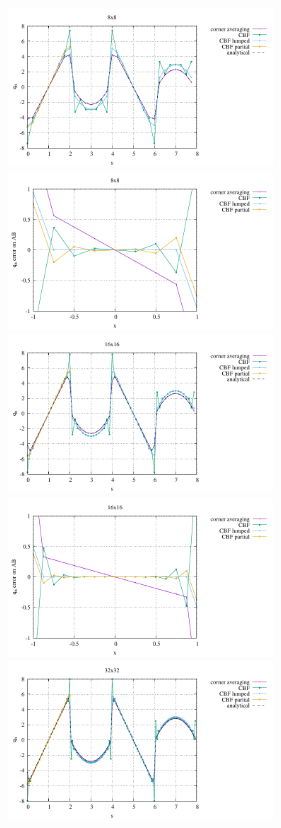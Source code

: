 \begin{center}
\includegraphics[width=7cm]{python_codes/fieldstone_173/results/exp5/heat_flux_boundary_8.pdf}
\includegraphics[width=7cm]{python_codes/fieldstone_173/results/exp5/heat_flux_boundary_bottom_8.pdf}\\
\includegraphics[width=7cm]{python_codes/fieldstone_173/results/exp5/heat_flux_boundary_16.pdf}
\includegraphics[width=7cm]{python_codes/fieldstone_173/results/exp5/heat_flux_boundary_bottom_16.pdf}\\
\includegraphics[width=7cm]{python_codes/fieldstone_173/results/exp5/heat_flux_boundary_32.pdf}

\end{center}

